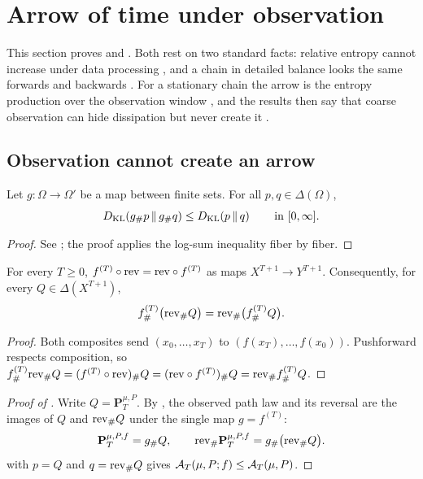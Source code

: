 \section{Arrow of time under observation}\label{sec:arrow-protocol}

This section proves \thmNGArrowDPI{} and \thmNGProtocolTrap.
Both rest on two standard facts: relative entropy cannot increase under data processing \citep{CoverThomas2006}, and a chain in detailed balance looks the same forwards and backwards \citep{Kelly1979}.
For a stationary chain the arrow is the entropy production over the observation window \citep{Seifert2012,MaesNetocny2003}, and the results then say that coarse observation can hide dissipation but never create it \citep{Esposito2012}.

\subsection{Observation cannot create an arrow}

\begin{lemma}\label{lem:deterministic_dpi_kl}
Let $g:\Omega\to\Omega'$ be a map between finite sets. For all $p,q\in\Delta(\Omega)$,
\[
  D_{\mathrm{KL}}\!\left(g_{\#}p\,\middle\|\,g_{\#}q\right)\le D_{\mathrm{KL}}\!\left(p\,\middle\|\,q\right)\qquad\text{in }[0,\infty].
\]
\end{lemma}

\begin{proof}
See ; the proof applies the log-sum inequality fiber by fiber.
\end{proof}

\begin{lemma}\label{lem:rev_pushforward_commute}
For every $T\ge 0$, $f^{(T)}\circ\mathrm{rev}=\mathrm{rev}\circ f^{(T)}$ as maps $X^{T+1}\to Y^{T+1}$. Consequently, for every $Q\in\Delta(X^{T+1})$,
\[
  f^{(T)}_{\#}\bigl(\mathrm{rev}_{\#}Q\bigr)=\mathrm{rev}_{\#}\bigl(f^{(T)}_{\#}Q\bigr).
\]
\end{lemma}

\begin{proof}
Both composites send $(x_0,\dots,x_T)$ to $(f(x_T),\dots,f(x_0))$.
Pushforward respects composition, so $f^{(T)}_{\#}\mathrm{rev}_{\#}Q=(f^{(T)}\circ\mathrm{rev})_{\#}Q=(\mathrm{rev}\circ f^{(T)})_{\#}Q=\mathrm{rev}_{\#}f^{(T)}_{\#}Q$.
\end{proof}

\begin{proof}[Proof of ]
Write $Q=\mathbf{P}^{\mu,P}_T$.
By , the observed path law and its reversal are the images of $Q$ and $\mathrm{rev}_{\#}Q$ under the single map $g=f^{(T)}$:
\[
  \mathbf{P}^{\mu,P,f}_T=g_{\#}Q,\qquad \mathrm{rev}_{\#}\mathbf{P}^{\mu,P,f}_T=g_{\#}\bigl(\mathrm{rev}_{\#}Q\bigr).
\]
 with $p=Q$ and $q=\mathrm{rev}_{\#}Q$ gives $\mathcal{A}_T(\mu,P;f)\le\mathcal{A}_T(\mu,P)$.
\end{proof}

